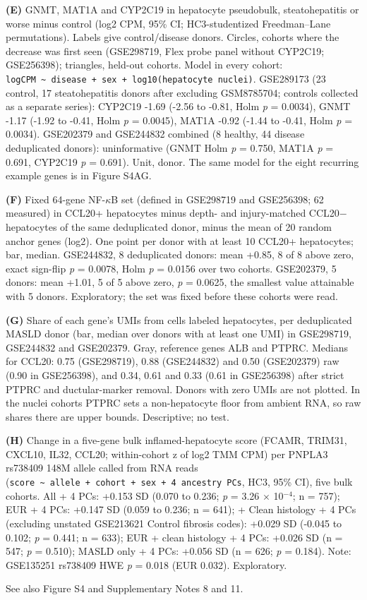 \textbf{(E)} GNMT, MAT1A and CYP2C19 in hepatocyte pseudobulk, steatohepatitis or worse minus control (log2 CPM, 95\% CI; HC3-studentized Freedman--Lane permutations). Labels give control/disease donors. Circles, cohorts where the decrease was first seen (GSE298719, Flex probe panel without CYP2C19; GSE256398); triangles, held-out cohorts. Model in every cohort: \texttt{logCPM\ \textasciitilde{}\ disease\ +\ sex\ +\ log10(hepatocyte\ nuclei)}. GSE289173 (23 control, 17 steatohepatitis donors after excluding GSM8785704; controls collected as a separate series): CYP2C19 -1.69 (-2.56 to -0.81, Holm \emph{p} = 0.0034), GNMT -1.17 (-1.92 to -0.41, Holm \emph{p} = 0.0045), MAT1A -0.92 (-1.44 to -0.41, Holm \emph{p} = 0.0034). GSE202379 and GSE244832 combined (8 healthy, 44 disease deduplicated donors): uninformative (GNMT Holm \emph{p} = 0.750, MAT1A \emph{p} = 0.691, CYP2C19 \emph{p} = 0.691). Unit, donor. The same model for the eight recurring example genes is in Figure S4AG.

\textbf{(F)} Fixed 64-gene NF-$\kappa$B set (defined in GSE298719 and GSE256398; 62 measured) in CCL20+ hepatocytes minus depth- and injury-matched CCL20$-$ hepatocytes of the same deduplicated donor, minus the mean of 20 random anchor genes (log2). One point per donor with at least 10 CCL20+ hepatocytes; bar, median. GSE244832, 8 deduplicated donors: mean +0.85, 8 of 8 above zero, exact sign-flip \emph{p} = 0.0078, Holm \emph{p} = 0.0156 over two cohorts. GSE202379, 5 donors: mean +1.01, 5 of 5 above zero, \emph{p} = 0.0625, the smallest value attainable with 5 donors. Exploratory; the set was fixed before these cohorts were read.

\textbf{(G)} Share of each gene's UMIs from cells labeled hepatocytes, per deduplicated MASLD donor (bar, median over donors with at least one UMI) in GSE298719, GSE244832 and GSE202379. Gray, reference genes ALB and PTPRC. Medians for CCL20: 0.75 (GSE298719), 0.88 (GSE244832) and 0.50 (GSE202379) raw (0.90 in GSE256398), and 0.34, 0.61 and 0.33 (0.61 in GSE256398) after strict PTPRC and ductular-marker removal. Donors with zero UMIs are not plotted. In the nuclei cohorts PTPRC sets a non-hepatocyte floor from ambient RNA, so raw shares there are upper bounds. Descriptive; no test.

\textbf{(H)} Change in a five-gene bulk inflamed-hepatocyte score (FCAMR, TRIM31, CXCL10, IL32, CCL20; within-cohort z of log2 TMM CPM) per PNPLA3 rs738409 148M allele called from RNA reads (\texttt{score\ \textasciitilde{}\ allele\ +\ cohort\ +\ sex\ +\ 4\ ancestry\ PCs}, HC3, 95\% CI), five bulk cohorts. All + 4 PCs: +0.153 SD (0.070 to 0.236; \emph{p} = 3.26 $\times$ 10$^{-4}$; n = 757); EUR + 4 PCs: +0.147 SD (0.059 to 0.236; n = 641); + Clean histology + 4 PCs (excluding unstated GSE213621 Control fibrosis codes): +0.029 SD (-0.045 to 0.102; \emph{p} = 0.441; n = 633); EUR + clean histology + 4 PCs: +0.026 SD (n = 547; \emph{p} = 0.510); MASLD only + 4 PCs: +0.056 SD (n = 626; \emph{p} = 0.184). Note: GSE135251 rs738409 HWE \emph{p} = 0.018 (EUR 0.032). Exploratory.

See also Figure S4 and Supplementary Notes 8 and 11.
